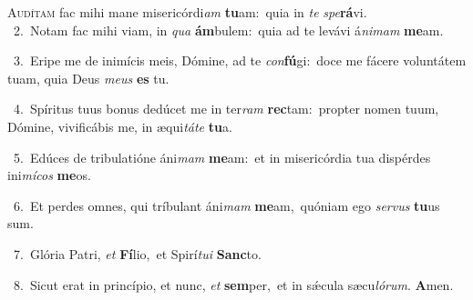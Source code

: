 \lettrine{\initial\textcolor{\initialcolor}{A}}{udítam} fac mihi mane misericórdi\textit{am} \textbf{tu}\-am:~\star quia in \textit{te} \textit{spe}\-\textbf{rá}vi.\\
{\numbfont\textcolor{\numbcolor}{~2.}}~Notam fac mihi viam, in \textit{qua} \textbf{ám}\-bulem:~\star quia ad te levávi á\-\textit{ni}\-\textit{mam} \textbf{me}\-am.\par
{\numbfont\textcolor{\numbcolor}{~3.}}~Eripe me de inimícis meis, Dómine, ad te \textit{con}\-\textbf{fú}gi:~\star doce me fácere voluntátem tuam, quia Deus \textit{me}\-\textit{us} \textbf{es} tu.\par
{\numbfont\textcolor{\numbcolor}{~4.}}~Spíritus tuus bonus dedúcet me in ter\textit{ram} \textbf{rec}\-tam:~\star propter nomen tuum, Dómine, vivificábis me, in æqui\-\textit{tá}\-\textit{te} \textbf{tu}\-a.\par
{\numbfont\textcolor{\numbcolor}{~5.}}~Edúces de tribulatióne áni\textit{mam} \textbf{me}\-am:~\star et in misericórdia tua dispérdes ini\-\textit{mí}\-\textit{cos} \textbf{me}\-os.\par
{\numbfont\textcolor{\numbcolor}{~6.}}~Et perdes omnes, qui tríbulant áni\textit{mam} \textbf{me}\-am,~\star quóniam ego \textit{ser}\-\textit{vus} \textbf{tu}\-us sum.\par
{\numbfont\textcolor{\numbcolor}{~7.}}~Glória Patri, \textit{et} \textbf{Fí}\-lio,~\star et Spirí\-\textit{tu}\-\textit{i} \textbf{Sanc}\-to.\par
{\numbfont\textcolor{\numbcolor}{~8.}}~Sicut erat in princípio, et nunc, \textit{et} \textbf{sem}\-per,~\star et in sǽcula sæcu\-\textit{ló}\-\textit{rum}. \textbf{A}\-men.\par
